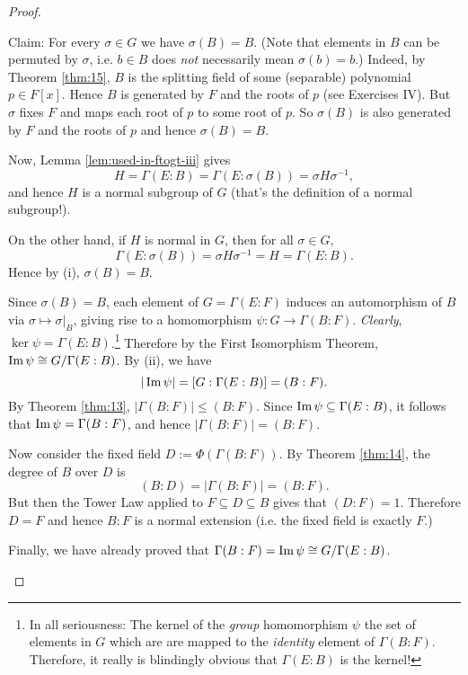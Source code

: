 \begin{theorem}
\begin{proof}
\begin{enumerate}
			Claim: For every $\sigma \in G$ we have $\sigma(B) = B$. (Note that elements in $B$ can be permuted by $\sigma$, i.e. $b \in B$ does \emph{not} necessarily mean $\sigma(b) = b$.) Indeed, by Theorem \ref{thm:15}, $B$ is the splitting field of some (separable) polynomial $p \in F[x]$. Hence $B$ is generated by $F$ and the roots of $p$ (see Exercises IV). But $\sigma$ fixes $F$ and maps each root of $p$ to some root of $p$. So $\sigma(B)$ is also generated by $F$ and the roots of $p$ and hence $\sigma(B) = B$.
			
			Now, Lemma \ref{lem:used-in-ftogt-iii} gives
			\[
				H = \Gamma(E : B) = \Gamma(E : \sigma(B)) = \sigma H \sigma^{-1},
			\]
			and hence $H$ is a normal subgroup of $G$ (that's the definition of a normal subgroup!).
			
			On the other hand, if $H$ is normal in $G$, then for all $\sigma \in G$,
			\[
				\Gamma(E : \sigma(B)) = \sigma H \sigma^{-1} = H = \Gamma(E : B).
			\]
			Hence by (i), $\sigma(B) = B$.
			
			Since $\sigma(B) = B$, each element of $G = \Gamma(E : F)$ induces an automorphism of $B$ via $\sigma \mapsto \sigma|_B$, giving rise to a homomorphism $\psi : G \to \Gamma(B : F)$. \emph{Clearly}, $\ker{\psi} = \Gamma(E : B)$.\footnote{In all seriousness: The kernel of the \emph{group} homomorphism $\psi$  the set of elements in $G$ which are are mapped to the \emph{identity} element of $\Gamma(B : F)$. Therefore, it really is blindingly obvious that $\Gamma(E : B)$ is the kernel!} Therefore by the First Isomorphism Theorem, $\operatorname{Im}{\psi} \cong G / \Gamma(E : B)$. By (ii), we have
			\[
				|\operatorname{Im}{\psi}| = [G : \Gamma(E : B)] = (B : F).
			\]
			By Theorem \ref{thm:13}, $|\Gamma(B : F)| \leq (B : F)$. Since $\operatorname{Im}{\psi} \subseteq \Gamma(E : B)$, it follows that $\operatorname{Im}{\psi} = \Gamma(B : F)$, and hence $|\Gamma(B : F)| = (B : F)$.
			
			Now consider the fixed field $D := \Phi(\Gamma(B : F))$. By Theorem \ref{thm:14}, the degree of $B$ over $D$ is
			\[
				(B : D) = |\Gamma(B : F)| = (B : F).
			\]
			But then the Tower Law applied to $F \subseteq D \subseteq B$ gives that $(D : F) = 1$. Therefore $D = F$ and hence $B : F$ is a normal extension (i.e. the fixed field is exactly $F$.)
			
			Finally, we have already proved that $\Gamma(B : F) = \operatorname{Im}{\psi} \cong G / \Gamma(E : B)$.
		\end{enumerate}
	\end{proof}
\end{theorem}

